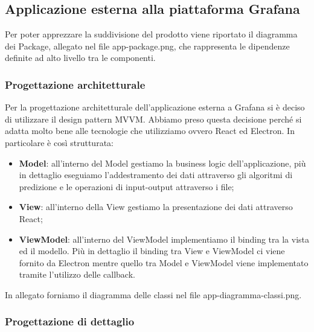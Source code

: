 	\subsection{Applicazione esterna alla piattaforma Grafana}
	Per poter apprezzare la suddivisione del prodotto viene riportato il diagramma dei Package, allegato nel file app-package.png, che rappresenta le dipendenze definite ad alto livello tra le componenti.
		\subsubsection{Progettazione architetturale}
			Per la progettazione architetturale dell'applicazione esterna a Grafana si è deciso di utilizzare il design pattern MVVM. Abbiamo preso questa decisione perché si adatta molto bene alle tecnologie che utilizziamo ovvero React ed Electron. In particolare è così strutturata:
		\begin{itemize}
			\item \textbf{Model}: all'interno del Model gestiamo la business logic dell'applicazione, più in dettaglio eseguiamo l'addestramento dei dati attraverso gli algoritmi di predizione e le operazioni di input-output attraverso i file;
			\item \textbf{View}: all'interno della View gestiamo la presentazione dei dati attraverso React;
			\item \textbf{ViewModel}: all'interno del ViewModel implementiamo il binding tra la vista ed il modello. Più in dettaglio il binding tra View e ViewModel ci viene fornito da Electron mentre quello tra Model e ViewModel viene implementato tramite l'utilizzo delle callback.
		\end{itemize}
		In allegato forniamo il diagramma delle classi nel file app-diagramma-classi.png.
		\subsubsection{Progettazione di dettaglio}
